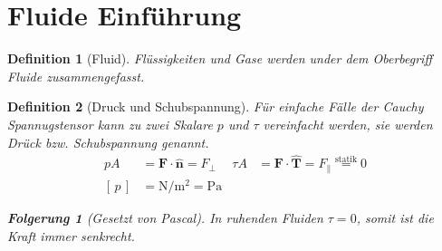 \documentclass[a4paper, twocolumn]{article}
\numberwithin{equation}{section}
\theoremstyle{hsr-def}
\newtheorem{definition}{Definition}[section]
\theoremstyle{hsr-sub}
\newtheorem{result}{Folgerung}[definition]
\renewcommand{\vec}[1]{\ensuremath{\mathbf{#1}}}
\newcommand{\uvec}[1]{\ensuremath{\vec{\hat{#1}}}}
\newcommand{\unitof}[1]{\ensuremath{\left[\,#1\,\right]}}
\begin{document}
\section{Fluide Einf\"uhrung}

\begin{definition}[Fluid]
Fl\"ussigkeiten und Gase werden under dem Oberbegriff \emph{Fluide} zusammengefasst.
\end{definition}



\begin{definition}[Druck und Schubspannung]
F\"ur einfache F\"alle der Cauchy Spannugstensor kann zu zwei Skalare \(p\) und \(\tau\) vereinfacht werden, sie werden Dr\"uck bzw. Schubspannung genannt.
\begin{align*}
    pA
    &= \vec{F}\cdot\uvec{n}
    = F_\perp
    &
    \tau A
    &= \vec{F}\cdot\uvec{T}
    = F_\parallel
    \stackrel{\text{statik}}{=} 0
    \\
    \unitof{p} &= \si{\newton\per\square\metre} = \si{\pascal} 
\end{align*}

\begin{result}[Gesetzt von Pascal]
In ruhenden Fluiden \(\tau = 0\), somit ist die Kraft immer senkrecht.
\end{result}


\end{definition}
\end{document}
